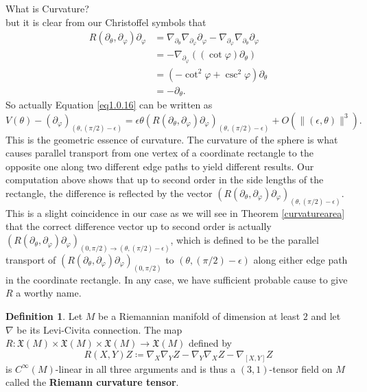 \documentclass{article}
\numberwithin{equation}{subsection}
\theoremstyle{definition}
\newtheorem{definition}{Definition}[subsection]
\begin{document}
\begin{section}{What is Curvature?}
\begin{equation}
\end{equation}
but it is clear from our Christoffel symbols that
\begin{equation}
\begin{split}
R(\partial_{\theta},\partial_{\varphi})\partial_{\varphi}&=\nabla_{\partial_{\theta}}\nabla_{\partial_{\varphi}}\partial_{\varphi}-\nabla_{\partial_{\varphi}}\nabla_{\partial_{\theta}}\partial_{\varphi}\\
&=-\nabla_{\partial_{\varphi}}((\cot{\varphi})\partial_{\theta})\\
&=(-\cot^2{\varphi}+\csc^2{\varphi})\partial_{\theta}\\
&=-\partial_{\theta}.
\end{split}
\end{equation}
So actually Equation \ref{eq1.0.16} can be written as
\begin{equation}
V(\theta)-(\partial_{\varphi})_{(\theta,(\pi/2)-\epsilon)}=\epsilon\theta(R(\partial_{\theta},\partial_{\varphi})\partial_{\varphi})_{(\theta,(\pi/2)-\epsilon)}+O\left(\|(\epsilon,\theta)\|^3\right).
\end{equation}
This is the geometric essence of curvature. The curvature of the sphere is what causes parallel transport from one vertex of a coordinate rectangle to the opposite one along two different edge paths to yield different results. Our computation above shows that up to second order in the side lengths of the rectangle, the difference is reflected by the vector $(R(\partial_{\theta},\partial_{\varphi})\partial_{\varphi})_{(\theta,(\pi/2)-\epsilon)}$. This is a slight coincidence in our case as we will see in Theorem \ref{curvaturearea} that the correct difference vector up to second order is actually $(R(\partial_{\theta},\partial_{\varphi})\partial_{\varphi})_{(0,\pi/2)\to(\theta,(\pi/2)-\epsilon)}$, which is defined to be the parallel transport of $(R(\partial_{\theta},\partial_{\varphi})\partial_{\varphi})_{(0,\pi/2)}$ to $(\theta,(\pi/2)-\epsilon)$ along either edge path in the coordinate rectangle. In any case, we have sufficient probable cause to give $R$ a worthy name.

\begin{definition}
Let $M$ be a Riemannian manifold of dimension at least $2$ and let $\nabla$ be its Levi-Civita connection. The map $R\colon\mathfrak{X}(M)\times\mathfrak{X}(M)\times\mathfrak{X}(M)\to\mathfrak{X}(M)$ defined by
\begin{equation}
R(X,Y)Z\coloneqq\nabla_X\nabla_YZ-\nabla_Y\nabla_XZ-\nabla_{[X,Y]}Z
\end{equation}
is $C^{\infty}(M)$-linear in all three arguments and is thus a $(3,1)$-tensor field on $M$ called the \textbf{Riemann curvature tensor}.
\end{definition}


\end{section}
\end{document}
